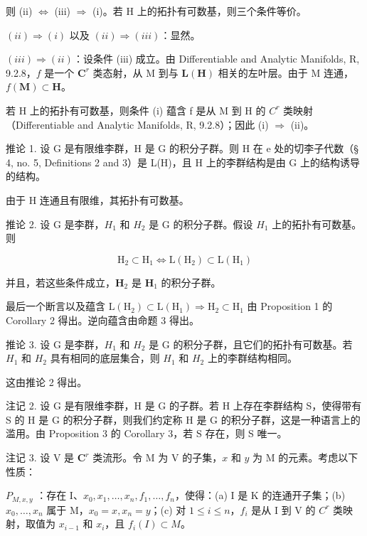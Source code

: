 则 (ii) \(\Leftrightarrow\) (iii) \(\Rightarrow\) (i)。若 H 上的拓扑有可数基，则三个条件等价。

\((ii) \Rightarrow (i)\) 以及 \((ii) \Rightarrow (iii)\)：显然。

\((iii) \Rightarrow (ii)\)：设条件 (iii) 成立。由 Differentiable and Analytic Manifolds, R, 9.2.8，\(f\) 是一个 \(\mathbf{C}^r\) 类态射，从 M 到与 \(\mathbf{L}(\mathbf{H})\) 相关的左叶层。由于 M 连通，\(f(\mathbf{M}) \subset \mathbf{H}\)。

若 H 上的拓扑有可数基，则条件 (i) 蕴含 f 是从 M 到 H 的 \(C^{r}\) 类映射（Differentiable and Analytic Manifolds, R, 9.2.8）；因此 (i) \(\Rightarrow\) (ii)。

推论 1. 设 G 是有限维李群，H 是 G 的积分子群。则 H 在 e 处的切李子代数（§ 4, no. 5, Definitions 2 and 3）是 L(H)，且 H 上的李群结构是由 G 上的结构诱导的结构。

由于 H 连通且有限维，其拓扑有可数基。

推论 2. 设 G 是李群，\(H_{1}\) 和 \(H_{2}\) 是 G 的积分子群。假设 \(H_{1}\) 上的拓扑有可数基。则

\[
\mathrm{H} _ {2} \subset \mathrm{H} _ {1} \Leftrightarrow \mathrm{L} (\mathrm{H} _ {2}) \subset \mathrm{L} (\mathrm{H} _ {1})
\]

并且，若这些条件成立，\(\mathbf{H}_2\) 是 \(\mathbf{H}_1\) 的积分子群。

最后一个断言以及蕴含 \(\mathrm{L}(\mathrm{H}_{2})\subset\mathrm{L}(\mathrm{H}_{1})\Rightarrow\mathrm{H}_{2}\subset\mathrm{H}_{1}\) 由 Proposition 1 的 Corollary 2 得出。逆向蕴含由命题 3 得出。

推论 3. 设 G 是李群，\(H_{1}\) 和 \(H_{2}\) 是 G 的积分子群，且它们的拓扑有可数基。若 \(H_{1}\) 和 \(H_{2}\) 具有相同的底层集合，则 \(H_{1}\) 和 \(H_{2}\) 上的李群结构相同。

这由推论 2 得出。

注记 2. 设 G 是有限维李群，H 是 G 的子群。若 H 上存在李群结构 S，使得带有 S 的 H 是 G 的积分子群，则我们约定称 H 是 G 的积分子群，这是一种语言上的滥用。由 Proposition 3 的 Corollary 3，若 S 存在，则 S 唯一。

注记 3. 设 V 是 \(\mathbf{C}^r\) 类流形。令 M 为 V 的子集，\(x\) 和 \(y\) 为 M 的元素。考虑以下性质：

\(P_{M,x,y}\) ：存在 I、\(x_{0}, x_{1}, \ldots, x_{n}, f_{1}, \ldots, f_{n}\)，使得：(a) I 是 K 的连通开子集；(b) \(x_{0}, \ldots, x_{n}\) 属于 M，\(x_{0} = x, x_{n} = y\)；(c) 对 \(1 \leqslant i \leqslant n\)，\(f_{i}\) 是从 I 到 V 的 \(C^{r}\) 类映射，取值为 \(x_{i-1}\) 和 \(x_{i}\)，且 \(f_{i}(I) \subset M\)。

